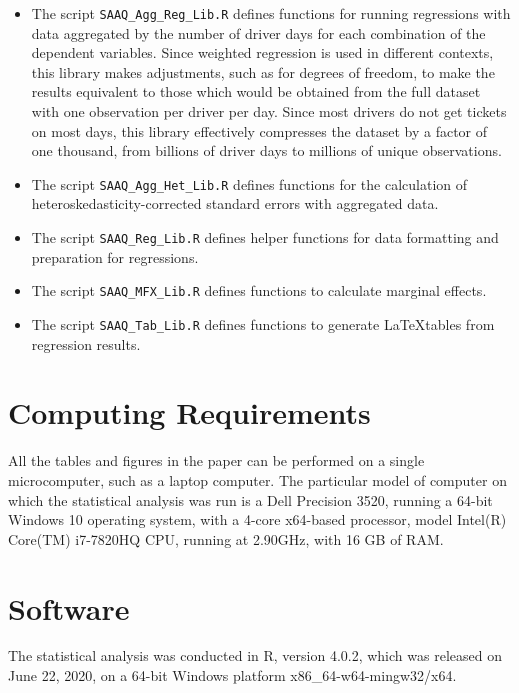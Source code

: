\documentclass[11pt]{paper}
\begin{document}
\begin{itemize}

\item  The script \texttt{SAAQ\_Agg\_Reg\_Lib.R} defines functions
    for running regressions with data aggregated by the 
    number of driver days for each combination of the 
    dependent variables. 
    Since weighted regression is used in different contexts, 
    this library makes adjustments, 
    such as for degrees of freedom,
    to make the results equivalent to those which would be obtained
    from the full dataset with one observation per driver per day. 
    Since most drivers do not get tickets on most days,
    this library effectively compresses the dataset
    by a factor of one thousand, 
    from billions of driver days to millions of unique observations.
\item  The script \texttt{SAAQ\_Agg\_Het\_Lib.R} 
    defines functions for the 
    calculation of heteroskedasticity-corrected standard errors
    with aggregated data.
\item  The script \texttt{SAAQ\_Reg\_Lib.R} defines helper functions
    for data formatting and preparation for regressions. 
\item  The script \texttt{SAAQ\_MFX\_Lib.R} defines functions
    to calculate marginal effects. 
\item  The script \texttt{SAAQ\_Tab\_Lib.R} defines functions
    to generate \LaTeX tables from regression results. 


\end{itemize}



\section*{Computing Requirements}

All the tables
and figures in the paper can be performed on a single microcomputer, 
such as a laptop computer.
The particular model of computer 
on which the statistical analysis was run
is a 
Dell Precision 3520,
running a 64-bit Windows 10 operating system, 
with a 4-core x64-based processor,
model Intel(R) Core(TM) i7-7820HQ CPU, 
running at 2.90GHz, 
with 16 GB of RAM.


\section*{Software}


The statistical analysis was conducted in R, version 4.0.2,
which was released on June 22, 2020, 
on a 64-bit Windows platform x86\_64-w64-mingw32/x64. 
\end{document}
